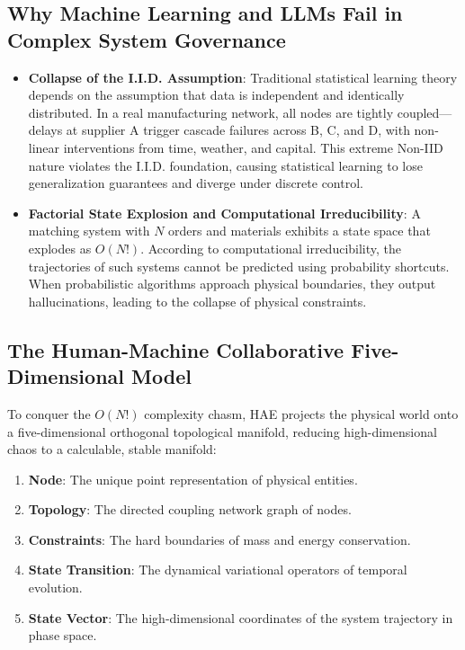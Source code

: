 \documentclass[11pt,a4paper]{article}
\begin{document}
\subsection{Why Machine Learning and LLMs Fail in Complex System Governance}
\begin{itemize}
    \item \textbf{Collapse of the I.I.D. Assumption}: Traditional statistical learning theory depends on the assumption that data is independent and identically distributed. In a real manufacturing network, all nodes are tightly coupled—delays at supplier A trigger cascade failures across B, C, and D, with non-linear interventions from time, weather, and capital. This extreme Non-IID nature violates the I.I.D. foundation, causing statistical learning to lose generalization guarantees and diverge under discrete control.
    \item \textbf{Factorial State Explosion and Computational Irreducibility}: A matching system with $N$ orders and materials exhibits a state space that explodes as $O(N!)$. According to computational irreducibility, the trajectories of such systems cannot be predicted using probability shortcuts. When probabilistic algorithms approach physical boundaries, they output hallucinations, leading to the collapse of physical constraints.
\end{itemize}

\subsection{The Human-Machine Collaborative Five-Dimensional Model}
To conquer the $O(N!)$ complexity chasm, HAE projects the physical world onto a five-dimensional orthogonal topological manifold, reducing high-dimensional chaos to a calculable, stable manifold:
\begin{enumerate}
    \item \textbf{Node}: The unique point representation of physical entities.
    \item \textbf{Topology}: The directed coupling network graph of nodes.
    \item \textbf{Constraints}: The hard boundaries of mass and energy conservation.
    \item \textbf{State Transition}: The dynamical variational operators of temporal evolution.
    \item \textbf{State Vector}: The high-dimensional coordinates of the system trajectory in phase space.
\end{enumerate}
\end{document}
